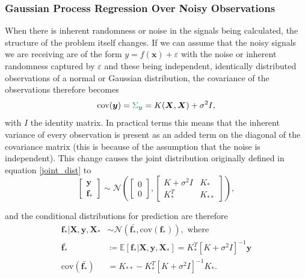
\subsubsection{Gaussian Process Regression Over Noisy Observations}

When there is inherent randomness or noise in the signals being calculated, the structure of the problem itself changes. If we can assume that the noisy signals we are receiving are of the form $y = f(\boldsymbol{x}) + \varepsilon$ with the noise or inherent randomness captured by $\varepsilon$ and these being independent, identically distributed observations of a normal or Gaussian distribution, the covariance  of the observations therefore becomes 
\[ \text{cov}(\boldsymbol{y}) = \green{\Sigma_{\boldsymbol{y}}} = K(\boldsymbol{X}, \boldsymbol{X}) + \sigma^2 I, \]
with $I$ the identity matrix. In practical terms this means that the inherent variance of every observation is present as an added term on the diagonal of the covariance matrix (this is because of the assumption that the noise is independent). This change causes the joint distribution originally defined in equation \ref{joint_dist} to
\[ 
\begin{bmatrix}
	\boldsymbol{y} \\
	\boldsymbol{f}_*
\end{bmatrix} \sim \mathcal{N}\left( \begin{bmatrix}
	0 \\
	0
\end{bmatrix} , \begin{bmatrix}
	K + \sigma^2 I & K_* \\
	K_*^T & K_{**}
\end{bmatrix} \right), 
\]

and the conditional distributions for prediction are therefore 
\begin{align*}
	\boldsymbol{f}_* | \boldsymbol{X}, \boldsymbol{y}, \boldsymbol{X}_* &\sim \mathcal{N}(\bar{\boldsymbol{f}_*}, \text{cov}(\boldsymbol{f}_*)), \text{ where} \\
	\bar{\boldsymbol{f}_*} &\coloneqq \mathbb{E}[\boldsymbol{f}_* | \boldsymbol{X}, \boldsymbol{y}, \boldsymbol{X}_*] = K_*^T [K + \sigma^2 I]^{-1} \boldsymbol{y} \\
	\text{cov}(\bar{\boldsymbol{f}_*}) &= K_{**} -  K_*^T [K + \sigma^2 I]^{-1} K_*.
\end{align*}

